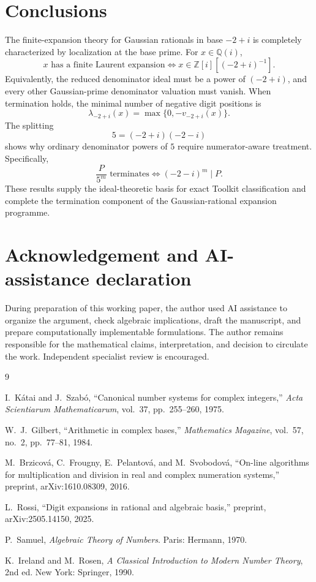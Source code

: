 \documentclass[11pt]{article}
\theoremstyle{definition}
\newcommand{\Zi}{\mathbb{Z}[i]}
\newcommand{\Qi}{\mathbb{Q}(i)}
\begin{document}
\section{Conclusions}

The finite-expansion theory for Gaussian rationals in base $-2+i$ is completely characterized by localization at the base prime.  For $x\in\Qi$,
\[
\boxed{
 x\text{ has a finite Laurent expansion}
 \iff
 x\in\Zi[(-2+i)^{-1}].
}
\]
Equivalently, the reduced denominator ideal must be a power of $(-2+i)$, and every other Gaussian-prime denominator valuation must vanish.  When termination holds, the minimal number of negative digit positions is
\[
\boxed{
\lambda_{-2+i}(x)=\max\{0,-v_{-2+i}(x)\}.
}
\]
The splitting
\[
5=(-2+i)(-2-i)
\]
shows why ordinary denominator powers of $5$ require numerator-aware treatment.  Specifically,
\[
\frac{P}{5^m}\text{ terminates}
\iff
(-2-i)^m\mid P.
\]
These results supply the ideal-theoretic basis for exact Toolkit classification and complete the termination component of the Gaussian-rational expansion programme.

\section*{Acknowledgement and AI-assistance declaration}
During preparation of this working paper, the author used AI assistance to organize the argument, check algebraic implications, draft the manuscript, and prepare computationally implementable formulations.  The author remains responsible for the mathematical claims, interpretation, and decision to circulate the work.  Independent specialist review is encouraged.

\begin{thebibliography}{9}

I.~K\'atai and J.~Szab\'o,
``Canonical number systems for complex integers,''
\emph{Acta Scientiarum Mathematicarum}, vol.~37, pp.~255--260, 1975.

W.~J.~Gilbert,
``Arithmetic in complex bases,''
\emph{Mathematics Magazine}, vol.~57, no.~2, pp.~77--81, 1984.

M.~Brzicov\'a, C.~Frougny, E.~Pelantov\'a, and M.~Svobodov\'a,
``On-line algorithms for multiplication and division in real and complex numeration systems,''
preprint, arXiv:1610.08309, 2016.

L.~Rossi,
``Digit expansions in rational and algebraic basis,''
preprint, arXiv:2505.14150, 2025.

P.~Samuel,
\emph{Algebraic Theory of Numbers}.
Paris: Hermann, 1970.

K.~Ireland and M.~Rosen,
\emph{A Classical Introduction to Modern Number Theory}, 2nd ed.
New York: Springer, 1990.

\end{thebibliography}
\end{document}
